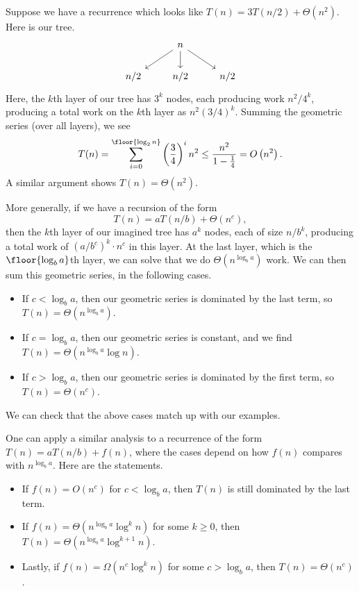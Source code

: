 \documentclass{article}
\begin{document}
\begin{example}
	Suppose we have a recurrence which looks like $T(n)=3T(n/2)+\Theta\left(n^2\right)$. Here is our tree.
	\[\begin{tikzcd}
		& n \\
		{n/2} & {n/2} & {n/2}
		\arrow[from=1-2, to=2-1]
		\arrow[from=1-2, to=2-2]
		\arrow[from=1-2, to=2-3]
	\end{tikzcd}\]
	Here, the $k$th layer of our tree has $3^k$ nodes, each producing work $n^2/4^k$, producing a total work on the $k$th layer as $n^2(3/4)^k$. Summing the geometric series (over all layers), we see
	\[T(n)=\sum_{i=0}^{\floor{\log_2n}}\left(\frac34\right)^in^2\le\frac{n^2}{1-\frac14}=O\left(n^2\right).\]
	A similar argument shows $T(n)=\Theta\left(n^2\right)$.
\end{example}
More generally, if we have a recursion of the form
\[T(n)=aT(n/b)+\Theta\left(n^c\right),\]
then the $k$th layer of our imagined tree has $a^k$ nodes, each of size $n/b^k$, producing a total work of $(a/b^c)^k\cdot n^c$ in this layer. At the last layer, which is the $\floor{\log_ba}$th layer, we can solve that we do $\Theta\left(n^{\log_ba}\right)$ work. We can then sum this geometric series, in the following cases.
\begin{itemize}
	\item If $c<\log_ba$, then our geometric series is dominated by the last term, so $T(n)=\Theta\left(n^{\log_ba}\right)$.
	\item If $c=\log_ba$, then our geometric series is constant, and we find $T(n)=\Theta\left(n^{\log_ba}\log n\right)$.
	\item If $c>\log_ba$, then our geometric series is dominated by the first term, so $T(n)=\Theta\left(n^c\right)$.
\end{itemize}
We can check that the above cases match up with our examples.
\begin{remark}
	One can apply a similar analysis to a recurrence of the form $T(n)=aT(n/b)+f(n)$, where the cases depend on how $f(n)$ compares with $n^{\log_ba}$. Here are the statements.
	\begin{itemize}
		\item If $f(n)=O\left(n^c\right)$ for $c<\log_ba$, then $T(n)$ is still dominated by the last term.
		\item If $f(n)=\Theta\left(n^{\log_ba}\log^kn\right)$ for some $k\ge0$, then $T(n)=\Theta\left(n^{\log_ba}\log^{k+1}n\right)$.
		\item Lastly, if $f(n)=\Omega\left(n^c\log^kn\right)$ for some $c>\log_ba$, then $T(n)=\Theta\left(n^c\right)$.
	\end{itemize}
\end{remark}
\end{document}
